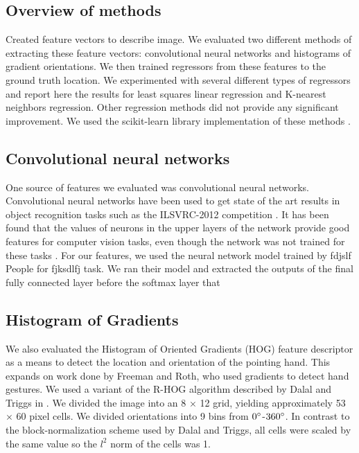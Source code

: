 \documentclass[10pt,twocolumn,letterpaper]{article}
\begin{document}
\subsection{Overview of methods}

Created feature vectors to describe image.  We evaluated two different methods of extracting these feature vectors: convolutional neural networks and histograms of gradient orientations.  We then trained regressors from these features to the ground truth location.  We experimented with several different types of regressors and report here the results for least squares linear regression and K-nearest neighbors regression.  Other regression methods did not provide any significant improvement.  We used the scikit-learn library implementation of these methods \cite{scikit-learn}.

\subsection{Convolutional neural networks}

One source of features we evaluated was convolutional neural networks.  Convolutional neural networks have been used to get state of the art results in object recognition tasks such as the ILSVRC-2012 competition \cite{krizhevsky2012imagenet}.  It has been found that the values of neurons in the upper layers of the network provide good features for computer vision tasks, even though the network was not trained for these tasks \cite{donahue2013decaf}.  For our features, we used the neural network model trained by fdjslf People for fjksdlfj task.  \cite{jia2014caffe}  We ran their model and extracted the outputs of the final fully connected layer before the softmax layer that 

\subsection{Histogram of Gradients}

We also evaluated the Histogram of Oriented Gradients (HOG) feature descriptor \cite{dalal2005histograms} as a means to detect the location and orientation of the pointing hand. This expands on work done by Freeman and Roth, who used gradients to detect hand gestures. We used a variant of the R-HOG algorithm described by Dalal and Triggs in \cite{dalal2005histograms}. We divided the image into an 8 $\times$ 12 grid, yielding approximately 53 $\times$ 60 pixel cells. We divided orientations into 9 bins from $0\degree$-$360\degree$. In contrast to the block-normalization scheme used by Dalal and Triggs, all cells were scaled by the same value so the $l^2$ norm of the cells was 1.
\end{document}
